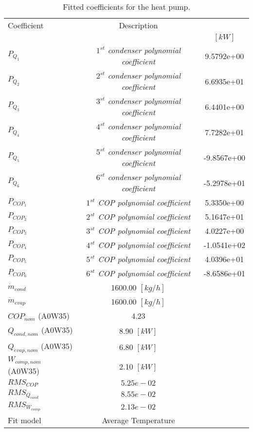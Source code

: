 \documentclass[english]{SPFShortReport}
\author{Dani Carbonell}
\begin{document}
\begin{table}[!ht]
\begin{small}
\caption{Fitted coefficients for the heat pump.}
\begin{center}
\resizebox{12cm}{!} 
{
\begin{tabular}{l | c c } 
\hline
\hline
Coefficient &Description & \\ 
 & &$[kW]$\\ 
\hline
$P_{Q_{1}}$ & \emph{$1^{st}$ condenser polynomial coefficient}  & 9.5792e+00    \\ 
$P_{Q_{2}}$ & \emph{$2^{st}$ condenser polynomial coefficient}  & 6.6935e+01    \\ 
$P_{Q_{3}}$ & \emph{$3^{st}$ condenser polynomial coefficient}  & 6.4401e+00    \\ 
$P_{Q_{4}}$ & \emph{$4^{st}$ condenser polynomial coefficient}  & 7.7282e+01    \\ 
$P_{Q_{5}}$ & \emph{$5^{st}$ condenser polynomial coefficient}  & -9.8567e+00    \\ 
$P_{Q_{6}}$ & \emph{$6^{st}$ condenser polynomial coefficient}  & -5.2978e+01    \\ 
\hline
$P_{COP_{1}}$ & \emph{$1^{st}$ COP polynomial coefficient}  & 5.3350e+00    \\ 
$P_{COP_{2}}$ & \emph{$2^{st}$ COP polynomial coefficient}  & 5.1647e+01    \\ 
$P_{COP_{3}}$ & \emph{$3^{st}$ COP polynomial coefficient}  & 4.0227e+00    \\ 
$P_{COP_{4}}$ & \emph{$4^{st}$ COP polynomial coefficient}  & -1.0541e+02    \\ 
$P_{COP_{5}}$ & \emph{$5^{st}$ COP polynomial coefficient}  & 4.0396e+01    \\ 
$P_{COP_{6}}$ & \emph{$6^{st}$ COP polynomial coefficient}  & -8.6586e+01    \\ 
\hline
$\dot m_{cond}$ & 1600.00 $[kg/h]$ \\ 
$\dot m_{evap}$ & 1600.00 $[kg/h]$ \\ 
\hline
$COP_{nom}$ (A0W35)& 4.23 \\ 
$Q_{cond,nom}$ (A0W35)& 8.90 $[kW]$\\ 
$Q_{evap,nom}$ (A0W35)& 6.80 $[kW]$\\ 
$W_{comp,nom}$ (A0W35)& 2.10 $[kW]$\\ 
\hline
 $RMS_{COP}$ & $5.25e-02$ \\ 
 $RMS_{Q_{cond}}$ & $8.55e-02$ \\ 
 $RMS_{W_{comp}}$ & $2.13e-02$ \\ 
\hline
Fit model & Average Temperature\\ 
\hline
\hline
\end{tabular}
}
\label{CoefTable}
\end{center}
\end{small}
\end{table}
\end{document}
